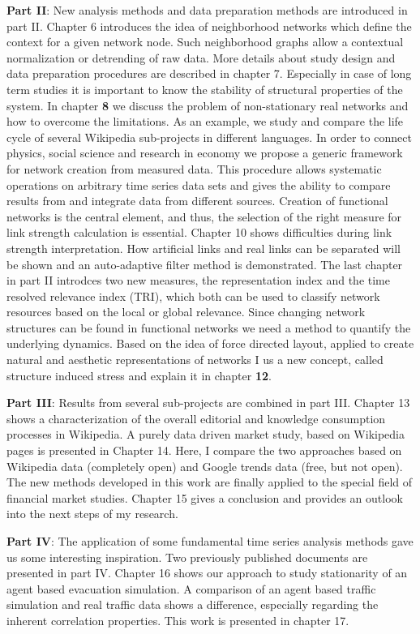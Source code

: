 \documentclass[a4paper,10pt]{scrbook}
\begin{document}
\textbf{Part II}: New analysis methods and data preparation methods are introduced in part II. Chapter 6 introduces the idea of neighborhood networks which define the context for a given network node. Such neighborhood graphs allow a contextual normalization or detrending of raw data. More details about study design and data preparation procedures are described in chapter 7. Especially in case of long term studies it is important to know the stability of structural properties of the system. In chapter \textbf{8} we discuss the problem of non-stationary real networks and how to overcome the limitations. As an example, we study and compare the life cycle of several Wikipedia sub-projects in different languages.  In order to connect physics, social science and research in economy we propose a generic framework for network creation from measured data. This procedure allows systematic operations on arbitrary time series data sets and gives the ability to compare results from and integrate data from different sources. Creation of functional networks is the central element, and thus, the selection of the right measure for link strength calculation is essential. Chapter 10 shows difficulties during link strength interpretation. How artificial links and real links can be separated will be shown and an auto-adaptive filter method is demonstrated. The last chapter in part II introdces two new measures, the representation index and the time resolved relevance index (TRI), which both can be used to classify network resources based on the local or global relevance. Since changing network structures can be found in functional networks we need a method to quantify the underlying dynamics. Based on the idea of force directed layout, applied to create natural and aesthetic representations of networks I us a new concept, called structure induced stress and explain it in chapter \textbf{12}.

\textbf{Part III}: Results from several sub-projects are combined in part III. Chapter 13 shows a characterization of the overall editorial and knowledge consumption processes in Wikipedia. A purely data driven market study, based on Wikipedia pages is presented in Chapter 14. Here, I compare the two approaches based on Wikipedia data (completely open) and Google trends data (free, but not open). The new methods developed in this work are finally applied to the special field of financial market studies. Chapter 15 gives a conclusion and provides an outlook into the next steps of my research. 

\textbf{Part IV}: The application of some fundamental time series analysis methods gave us some interesting inspiration. Two previously published documents are presented in part IV. Chapter 16 shows our approach to study stationarity of an agent based evacuation simulation. A comparison of an agent based traffic simulation and real traffic data shows a difference, especially regarding the inherent correlation properties. This work is presented in chapter 17. 
  
\end{document}
